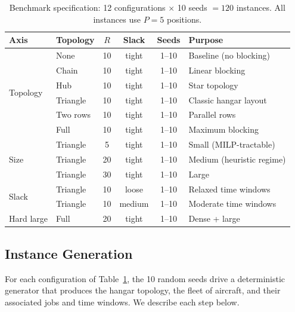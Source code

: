 \begin{table}[htbp]
  \centering
  \caption{Benchmark specification: 12 configurations $\times$ 10 seeds
           $= 120$ instances.  All instances use $P = 5$ positions.}
  \label{tab:benchmark_matrix}
  \begin{tabular}{llcccl}
    \toprule
    Axis & Topology & $R$ & Slack & Seeds & Purpose \\
    \midrule
    \multirow{6}{*}{Topology}
      & None         & 10 & tight  & 1--10 & Baseline (no blocking) \\
      & Chain        & 10 & tight  & 1--10 & Linear blocking \\
      & Hub          & 10 & tight  & 1--10 & Star topology \\
      & Triangle     & 10 & tight  & 1--10 & Classic hangar layout \\
      & Two rows     & 10 & tight  & 1--10 & Parallel rows \\
      & Full         & 10 & tight  & 1--10 & Maximum blocking \\
    \midrule
    \multirow{3}{*}{Size}
      & Triangle & 5  & tight  & 1--10 & Small (MILP-tractable) \\
      & Triangle & 20 & tight  & 1--10 & Medium (heuristic regime) \\
      & Triangle & 30 & tight  & 1--10 & Large \\
    \midrule
    \multirow{2}{*}{Slack}
      & Triangle & 10 & loose  & 1--10 & Relaxed time windows \\
      & Triangle & 10 & medium & 1--10 & Moderate time windows \\
    \midrule
    Hard large
      & Full & 20 & tight  & 1--10 & Dense + large \\
    \bottomrule
  \end{tabular}
\end{table}

\subsection{Instance Generation}
\label{sec:instance_gen}

For each configuration of Table~\ref{tab:benchmark_matrix}, the 10 random
seeds drive a deterministic generator that produces the hangar topology,
the fleet of aircraft, and their associated jobs and time windows.  We
describe each step below.

